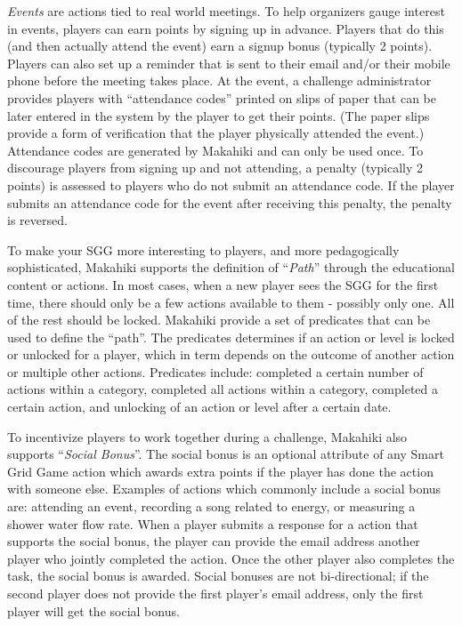 {\em Events} are actions tied to real world meetings. To help organizers gauge interest in events, players can earn points by signing up in advance. Players that do this (and then actually attend the event) earn a signup bonus (typically 2 points). Players can also set up a reminder that is sent to their email and/or their mobile phone before the meeting takes place. At the event, a challenge administrator provides players with ``attendance codes'' printed on slips of paper that can be later entered in the system by the player to get their points. (The paper slips provide a form of verification that the player physically attended the event.) Attendance codes are generated by Makahiki and can only be used once. To discourage players from signing up and not attending, a penalty (typically 2 points) is assessed to players who do not submit an attendance code. If the player submits an attendance code for the event after receiving this penalty, the penalty is reversed. 

To make your SGG more interesting to players, and more pedagogically sophisticated, Makahiki supports the definition of ``{\em Path}'' through the educational content or actions. In most cases, when a new player sees the SGG for the first time, there should only be a few actions available to them - possibly only one. All of the rest should be locked. Makahiki provide a set of predicates that can be used to define the ``path''. The predicates  determines if an action or level is locked or unlocked for a player, which in term depends on the outcome of another action or multiple other actions. Predicates include: completed a certain number of actions within a category, completed all actions within a category, completed  a certain action, and unlocking of an action or level after a certain date.

To incentivize players to work together during a challenge, Makahiki also supports ``{\em Social Bonus}''. The social bonus is an optional attribute of any Smart Grid Game action which awards extra points if the player has done the action with someone else. Examples of actions which commonly include a social bonus are: attending an event, recording a song related to energy, or measuring a shower water flow rate. When a player submits a response for a action that supports the social bonus, the player can provide the email address another player who jointly completed the action. Once the other player also completes the task, the social bonus is awarded. Social bonuses are not bi-directional; if the second player does not provide the first player's email address, only the first player will get the social bonus.


